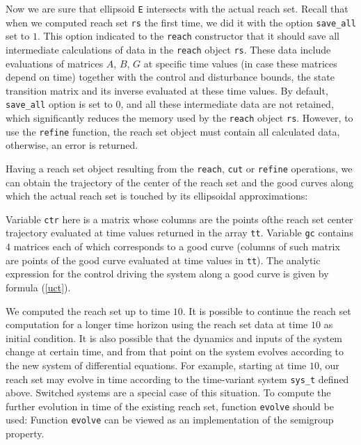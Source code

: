 \documentclass{report}
\begin{document}
Now we are sure that ellipsoid {\tt E} intersects with the actual reach set.
Recall that when we computed reach set {\tt rs} the first time, we did it
with the option {\tt save\_all} set to $1$. This option indicated to the
{\tt reach} constructor that it should save all intermediate calculations of
data in the {\tt reach} object {\tt rs}. These data include evaluations
of matrices $A$, $B$, $G$ at specific time values (in case these
matrices depend on time) together with the control and disturbance
bounds, the state transition matrix and its inverse evaluated at
these time values.
By default, {\tt save\_all} option is set to $0$, and all these intermediate
data are not retained, which significantly reduces the memory used
by the {\tt reach} object {\tt rs}. However, to use the {\tt refine} function,
the reach set object must contain all calculated data, otherwise, an
error is returned.

Having a reach set object resulting from the {\tt reach}, {\tt cut} or
{\tt refine} operations, we can obtain the trajectory of the center
of the reach set and the good curves along which the actual reach set
is touched by its ellipsoidal approximations:

Variable {\tt ctr} here is a matrix whose columns are the points ofthe
reach set center trajectory evaluated at time values returned in the
array {\tt tt}. Variable {\tt gc} contains $4$ matrices each of which
corresponds to a good curve (columns of such matrix are points of the
good curve evaluated at time values in {\tt tt}).
The analytic expression for the control driving the system along a good
curve is given by formula (\ref{uct}).

We computed the reach set up to time $10$. It is possible to continue
the reach set computation for a longer time horizon using the reach set
data at time $10$ as initial condition.
It is also possible that the dynamics and inputs of the system change at
certain time, and from that point on the system evolves according to the new
system of differential equations. For example, starting at time $10$, our
reach set may evolve in time according to the time-variant system {\tt sys\_t}
defined above. Switched systems are a special case of this situation.
To compute the further evolution in time of the existing reach set,
function {\tt evolve} should be used:
Function {\tt evolve} can be viewed as an implementation of the semigroup
property.
\end{document}
